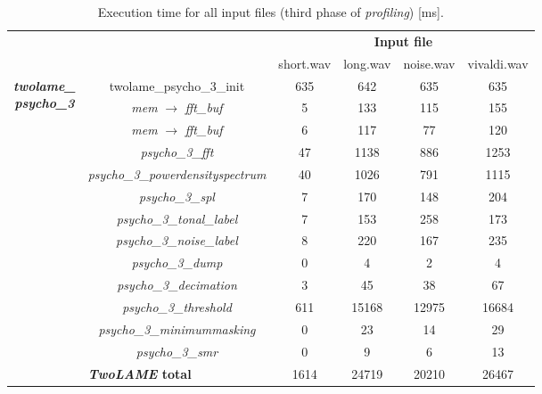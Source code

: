 \begin{table}[H]
    \centering
    \begin{tabular}{|c|c|c|c|c|c|}
    \cline{3-6}
    \multicolumn{2}{c|}{}  & \multicolumn{4}{c|}{\textbf{Input file}} \\
    \cline{3-6}
    \multicolumn{2}{c|}{} & short.wav & long.wav & noise.wav & vivaldi.wav \\
    \cline{1-6}
   \multirow{13}{*}{\parbox{2.3cm}{\centering \textbf{\textit{twolame\_} \\ \textit{psycho\_3}}}}  & \multicolumn{1}{c|}{twolame\_psycho\_3\_init}  & 635 & 642 & 635 & 635 \\ 
    \cline{2-6}
    & \multicolumn{1}{c|}{\textit{mem} $\rightarrow$ \textit{fft\_buf}} & 5 & 133 & 115 & 155 \\ 
    \cline{2-6}
    & \multicolumn{1}{c|}{\textit{mem} $\rightarrow$ \textit{fft\_buf}} &  6 &  117& 77 &  120 \\ 
    \cline{2-6}
    & \multicolumn{1}{c|}{\textit{psycho\_3\_fft}} & 47 & 1138 & 886 &  1253  \\ 
    \cline{2-6}
    & \multicolumn{1}{c|}{\textit{psycho\_3\_powerdensityspectrum}} & 40  & 1026 & 791 &  1115  \\ 
    \cline{2-6}
    & \multicolumn{1}{c|}{\textit{psycho\_3\_spl}} &  7 & 170 & 148 & 204  \\ 
    \cline{2-6}
     & \multicolumn{1}{c|}{\textit{psycho\_3\_tonal\_label}} &  7 & 153 & 258 & 173  \\ 
    \cline{2-6}
    & \multicolumn{1}{c|}{\textit{psycho\_3\_noise\_label}} & 8 & 220 & 167 & 235  \\ 
    \cline{2-6}
    & \multicolumn{1}{c|}{\textit{psycho\_3\_dump}} &  0 & 4 & 2 & 4  \\ 
    \cline{2-6}
    & \multicolumn{1}{c|}{\textit{psycho\_3\_decimation}} & 3 & 45 & 38 & 67   \\
    \cline{2-6}
    & \multicolumn{1}{c|}{\textit{psycho\_3\_threshold}} & 611 & 15168  & 12975 &  16684 \\
    \cline{2-6}
    & \multicolumn{1}{c|}{\textit{psycho\_3\_minimummasking}} & 0 & 23 & 14 & 29  \\ 
    \cline{2-6}
    & \multicolumn{1}{c|}{\textit{psycho\_3\_smr}} & 0 & 9 & 6 & 13  \\ 
    \hline
    \multicolumn{2}{|c|}{\textbf{\textit{TwoLAME} total}}  & 1614 & 24719 & 20210 & 26467 \\ 
    \hline
    \end{tabular}
    \caption{Execution time for all input files (third phase of \textit{profiling}) [ms].}
    \label{profiling3}
\end{table}

